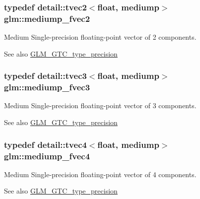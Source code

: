 \subsubsection[{\texorpdfstring{mediump\+\_\+fvec2}{mediump_fvec2}}]{\setlength{\rightskip}{0pt plus 5cm}typedef detail\+::tvec2$<$float, mediump$>$ {\bf glm\+::mediump\+\_\+fvec2}}\hypertarget{group__gtc__type__precision_ga5c2686caa6838515f6727eea1b64aa05}{}\label{group__gtc__type__precision_ga5c2686caa6838515f6727eea1b64aa05}
Medium Single-\/precision floating-\/point vector of 2 components. \begin{DoxySeeAlso}{See also}
\hyperlink{group__gtc__type__precision}{G\+L\+M\+\_\+\+G\+T\+C\+\_\+type\+\_\+precision} 
\end{DoxySeeAlso}
\subsubsection[{\texorpdfstring{mediump\+\_\+fvec3}{mediump_fvec3}}]{\setlength{\rightskip}{0pt plus 5cm}typedef detail\+::tvec3$<$float, mediump$>$ {\bf glm\+::mediump\+\_\+fvec3}}\hypertarget{group__gtc__type__precision_ga710c3af5ebb05e5e863cff78affd25a6}{}\label{group__gtc__type__precision_ga710c3af5ebb05e5e863cff78affd25a6}
Medium Single-\/precision floating-\/point vector of 3 components. \begin{DoxySeeAlso}{See also}
\hyperlink{group__gtc__type__precision}{G\+L\+M\+\_\+\+G\+T\+C\+\_\+type\+\_\+precision} 
\end{DoxySeeAlso}
\subsubsection[{\texorpdfstring{mediump\+\_\+fvec4}{mediump_fvec4}}]{\setlength{\rightskip}{0pt plus 5cm}typedef detail\+::tvec4$<$float, mediump$>$ {\bf glm\+::mediump\+\_\+fvec4}}\hypertarget{group__gtc__type__precision_gaba16de142de00531a1598d83716c6939}{}\label{group__gtc__type__precision_gaba16de142de00531a1598d83716c6939}
Medium Single-\/precision floating-\/point vector of 4 components. \begin{DoxySeeAlso}{See also}
\hyperlink{group__gtc__type__precision}{G\+L\+M\+\_\+\+G\+T\+C\+\_\+type\+\_\+precision} 
\end{DoxySeeAlso}

